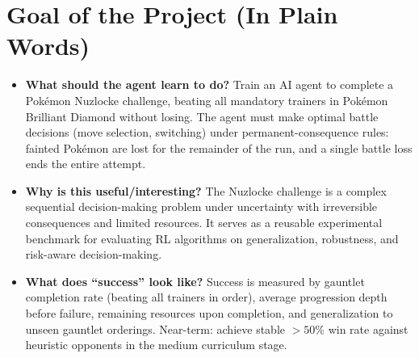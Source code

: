\documentclass[11pt, a4paper]{article}
\begin{document}
\section{Goal of the Project (In Plain Words)}
\begin{itemize}
    \item \textbf{What should the agent learn to do?}
        Train an AI agent to complete a Pok\'{e}mon Nuzlocke challenge, beating all mandatory trainers in Pok\'{e}mon Brilliant Diamond without losing. The agent must make optimal battle decisions (move selection, switching) under permanent-consequence rules: fainted Pok\'{e}mon are lost for the remainder of the run, and a single battle loss ends the entire attempt.

    \item \textbf{Why is this useful/interesting?}
        The Nuzlocke challenge is a complex sequential decision-making problem under uncertainty with irreversible consequences and limited resources. It serves as a reusable experimental benchmark for evaluating RL algorithms on generalization, robustness, and risk-aware decision-making.

    \item \textbf{What does ``success'' look like?}
        Success is measured by gauntlet completion rate (beating all trainers in order), average progression depth before failure, remaining resources upon completion, and generalization to unseen gauntlet orderings. Near-term: achieve stable $>50\%$ win rate against heuristic opponents in the medium curriculum stage.
\end{itemize}

\end{document}
